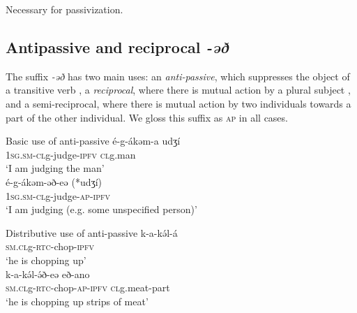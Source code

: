 Necessary for passivization.




\subsection{Antipassive and reciprocal \textit{-əð}}\label{sec:ch11:antipassive}


The suffix \textit{-əð}  has two main uses: an \textit{anti-passive}, which suppresses the object of a transitive verb , a \textit{reciprocal}, where there is mutual action by a plural subject , and a semi-reciprocal, where there is mutual action by two individuals towards a part of the other individual. We gloss this suffix as \textsc{ap} in all cases. %

\ea Basic use of anti-passive
\ea \gll	é-g-ákəm-a 	udʒí  \\
	1\textsc{sg.sm-cl}g-judge-\textsc{ipfv}	\textsc{cl}g.man	\\
	\trans ‘I am judging the man’\\
\ex \gll	é-g-ákəm-əð-eə  (*udʒí)	\\
	1\textsc{sg.sm-cl}g-judge-\textsc{ap-\textsc{ipfv}} \\
	\trans ‘I am judging (e.g. some unspecified person)’\\ \label{ex:ch11:apb2}
\z 

\ex  Distributive use of anti-passive
\ea	k-a-kə́l-á		\\
	\textsc{sm.cl}g-\textsc{rtc}-chop-\textsc{ipfv}\\
	\trans ‘he is chopping up’\\
\ex \gll	k-a-kə́l-ə́ð-eə 			eð-ano	\\
	\textsc{sm.cl}g-\textsc{rtc}-chop-\textsc{ap-\textsc{ipfv}}	\textsc{cl}g.meat-part\\
	\trans ‘he is chopping up strips of meat’\\ \label{ex:ch11:apd2}
\z 

